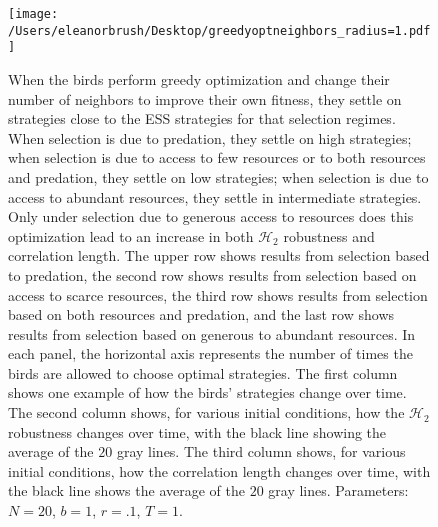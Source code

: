 \documentclass{article}
\begin{document}

\begin{figure}
\texttt{[image: /Users/eleanorbrush/Desktop/greedyoptneighbors\_radius=1.pdf]}
\caption{\label{greedyopt} When the birds perform greedy optimization and change their number of neighbors to improve their own fitness, they settle on strategies close to the ESS strategies for that selection regimes. When selection is due to predation, they settle on high strategies; when selection is due to access to few resources or to both resources and predation, they settle on low strategies; when selection is due to access to abundant resources, they settle in intermediate strategies. Only under selection due to generous access to resources does this optimization lead to an increase in both $\mathscr{H}_2$ robustness and correlation length. The upper row shows results from selection based to predation, the second row shows results from selection based on access to scarce resources, the third row shows results from selection based on both resources and predation, and the last row shows results from selection based on generous to abundant resources. In each panel, the  horizontal axis represents the number of times the birds are allowed to choose optimal strategies. The first column shows one example of how the birds' strategies change over time. The second column shows, for various initial conditions, how the $\mathscr{H}_2$ robustness changes over time, with the black line showing the average of the $20$ gray lines. The third column shows, for various initial conditions, how the correlation length changes over time, with the black line shows the average of the $20$ gray lines. Parameters:  $N=20$, $b=1$, $r=.1$, $T=1$. 
}
\end{figure}
\end{document}
